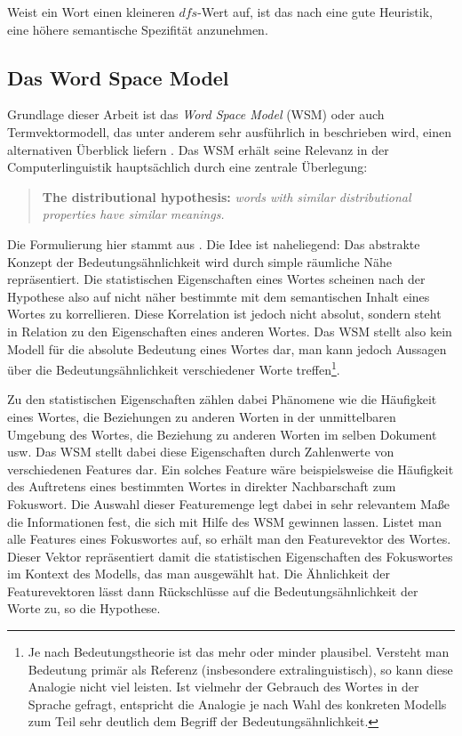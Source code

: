 \documentclass[11pt,numbers=noenddot]{scrartcl}
\begin{document}
Weist ein Wort einen kleineren $dfs$-Wert auf, ist das nach \citet{Caraballo99determiningthe} eine gute Heuristik, eine höhere semantische Spezifität anzunehmen.

\subsection{Das Word Space Model}\label{wsm}
Grundlage dieser Arbeit ist das \emph{Word Space Model} (WSM) oder auch Termvektormodell, das unter anderem sehr ausführlich in \citet{sahlgren2006word} beschrieben wird, einen alternativen Überblick liefern \citet{Turney10fromfrequency}. Das WSM erhält seine Relevanz in der Computerlinguistik hauptsächlich durch eine zentrale Überlegung:
\begin{quote}
    \textbf{The distributional hypothesis:} \emph{words with similar distributional properties have similar meanings.}
\end{quote}
Die Formulierung hier stammt aus \citet[S. 21]{sahlgren2006word}. Die Idee ist naheliegend: Das abstrakte Konzept der Bedeutungsähnlichkeit wird durch simple räumliche Nähe repräsentiert. Die statistischen Eigenschaften eines Wortes scheinen nach der Hypothese also auf nicht näher bestimmte mit dem semantischen Inhalt eines Wortes zu korrellieren. Diese Korrelation ist jedoch nicht absolut, sondern steht in Relation zu den Eigenschaften eines anderen Wortes. Das WSM stellt also kein Modell für die absolute Bedeutung eines Wortes dar, man kann jedoch Aussagen über die Bedeutungsähnlichkeit verschiedener Worte treffen\footnote{Je nach Bedeutungstheorie ist das mehr oder minder plausibel. Versteht man Bedeutung primär als Referenz (insbesondere extralinguistisch), so kann diese Analogie nicht viel leisten. Ist vielmehr der Gebrauch des Wortes in der Sprache gefragt, entspricht die Analogie je nach Wahl des konkreten Modells zum Teil sehr deutlich dem Begriff der Bedeutungsähnlichkeit.}.

Zu den statistischen Eigenschaften zählen dabei Phänomene wie die Häufigkeit eines Wortes, die Beziehungen zu anderen Worten in der unmittelbaren Umgebung des Wortes, die Beziehung zu anderen Worten im selben Dokument usw. Das WSM stellt dabei diese Eigenschaften durch Zahlenwerte von verschiedenen Features dar. Ein solches Feature wäre beispielsweise die Häufigkeit des Auftretens eines bestimmten Wortes in direkter Nachbarschaft zum Fokuswort. Die Auswahl dieser Featuremenge legt dabei in sehr relevantem Maße die Informationen fest, die sich mit Hilfe des WSM gewinnen lassen. Listet man alle Features eines Fokuswortes auf, so erhält man den Featurevektor des Wortes. Dieser Vektor repräsentiert damit die statistischen Eigenschaften des Fokuswortes im Kontext des Modells, das man ausgewählt hat. Die Ähnlichkeit der Featurevektoren lässt dann Rückschlüsse auf die Bedeutungsähnlichkeit der Worte zu, so die Hypothese.
\end{document}
